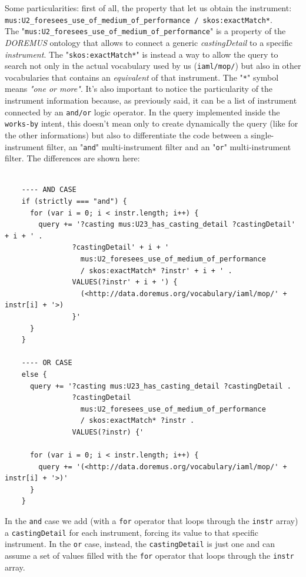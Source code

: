 \documentclass[a4paper,12pt]{report}
\begin{document}
	Some particularities: first of all, the property that let us obtain the instrument:\\ \texttt{mus:U2\_foresees\_use\_of\_medium\_of\_performance
		/ skos:exactMatch*}.\\
	The "\texttt{mus:U2\_foresees\_use\_of\_medium\_of\_performance}" is a property of the \textit{DOREMUS} ontology that allows to connect a generic \textit{castingDetail} to a specific \textit{instrument}. The "\texttt{skos:exactMatch*}" is instead a way to allow the query to search not only in the actual vocabulary used by us (\texttt{iaml/mop/}) but also in other vocabularies that contains an \textit{equivalent} of that instrument. The "\texttt{*}" symbol means \textit{"one or more"}.
	It's also important to notice the particularity of the instrument information because, as previously said, it can be a list of instrument connected by an \texttt{and/or} logic operator. In the query implemented inside the \texttt{works-by} intent, this doesn't mean only to create dynamically the query (like for the other informations) but also to differentiate the code between a single-instrument filter, an "\texttt{and}" multi-instrument filter and an "\texttt{or}" multi-instrument filter. The differences are shown here:
	\begin{lstlisting}
	
	---- AND CASE
	if (strictly === "and") {
	  for (var i = 0; i < instr.length; i++) {
	    query += '?casting mus:U23_has_casting_detail ?castingDetail' + i + ' .
	            ?castingDetail' + i + '
	              mus:U2_foresees_use_of_medium_of_performance
	              / skos:exactMatch* ?instr' + i + ' .
	            VALUES(?instr' + i + ') {
	              (<http://data.doremus.org/vocabulary/iaml/mop/' + instr[i] + '>)
	            }'
	  }
	}
	
	---- OR CASE
	else {
	  query += '?casting mus:U23_has_casting_detail ?castingDetail .
	            ?castingDetail
	              mus:U2_foresees_use_of_medium_of_performance
	              / skos:exactMatch* ?instr .
	            VALUES(?instr) {'
	
	  for (var i = 0; i < instr.length; i++) {
	    query += '(<http://data.doremus.org/vocabulary/iaml/mop/' + instr[i] + '>)'
	  }
	}
	\end{lstlisting}
	In the \texttt{and} case we add (with a \texttt{for} operator that loops through the \texttt{instr} array) a \texttt{castingDetail} for each instrument, forcing its value to that specific instrument. In the \texttt{or} case, instead, the \texttt{castingDetail} is just one and can assume a set of values filled with the \texttt{for} operator that loops through the \texttt{instr} array. 
\end{document}
